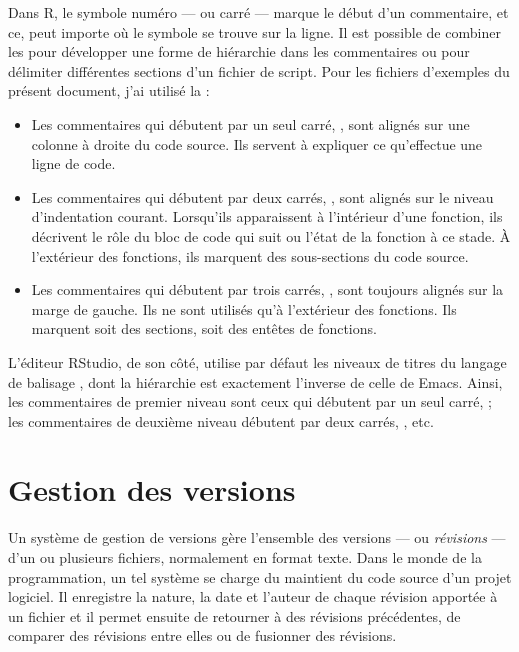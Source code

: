 Dans R, le symbole numéro \code{\#} --- ou carré --- marque le début
d'un commentaire, et ce, peut importe où le symbole se trouve sur la
ligne. Il est possible de combiner les \code{\#} pour développer une
forme de hiérarchie dans les commentaires ou pour délimiter
différentes sections d'un fichier de script. Pour les fichiers
d'exemples du présent document, j'ai utilisé la
:
\begin{itemize}
\item Les commentaires qui débutent par un seul carré, \code{\#}, sont
  alignés sur une colonne à droite du code source. Ils servent à
  expliquer ce qu'effectue une ligne de code.
\item Les commentaires qui débutent par deux carrés, \code{\#\#}, sont
  alignés sur le niveau d'indentation courant. Lorsqu'ils apparaissent à
  l'intérieur d'une fonction, ils décrivent le rôle du bloc de code qui
  suit ou l'état de la fonction à ce stade. À l'extérieur des
  fonctions, ils marquent des sous-sections du code source.
\item Les commentaires qui débutent par trois carrés, \code{\#\#\#},
  sont toujours alignés sur la marge de gauche. Ils ne sont utilisés
  qu'à l'extérieur des fonctions. Ils marquent soit des sections, soit
  des entêtes de fonctions.
\end{itemize}

L'éditeur RStudio, de son côté, utilise par défaut les
niveaux de titres du langage de balisage
,
dont la hiérarchie est exactement l'inverse de celle de Emacs. Ainsi,
les commentaires de premier niveau sont ceux qui débutent par un seul
carré, \code{\#}; les commentaires de deuxième niveau débutent par
deux carrés, \code{\#\#}, etc.


\section{Gestion des versions}
\label{sec:collaboration:git}

Un système de gestion de versions gère l'ensemble des versions --- ou
\emph{révisions} --- d'un ou plusieurs fichiers, normalement en format
texte. Dans le monde de la programmation, un tel système se charge du
maintient du code source d'un projet logiciel. Il enregistre la
nature, la date et l'auteur de chaque révision apportée à un fichier
et il permet ensuite de retourner à des révisions précédentes, de
comparer des révisions entre elles ou de fusionner des révisions.

